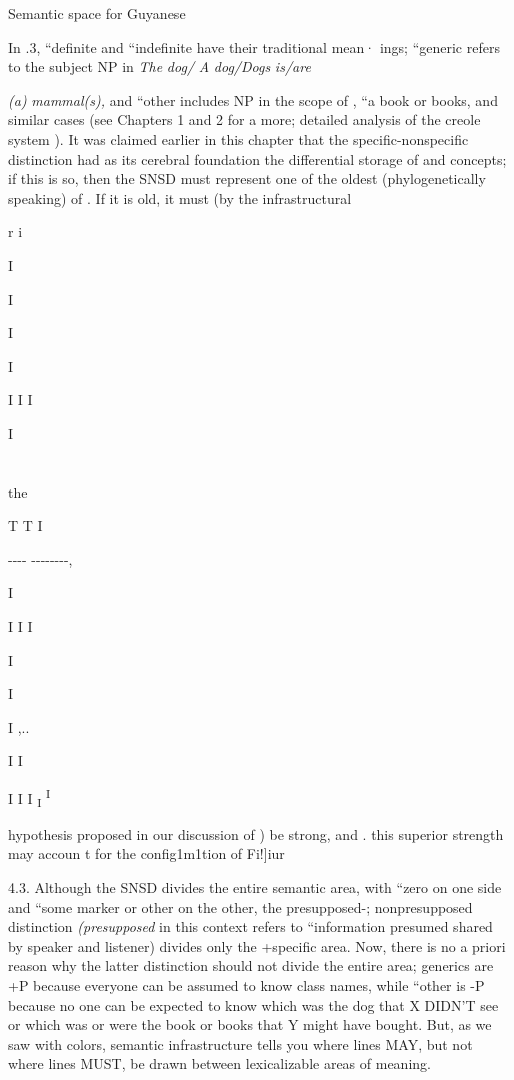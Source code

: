 Semantic space for Guyanese 



In .3, ``definite and ``indefinite have their traditional mean· ings; ``generic refers to the subject NP in \textit{The} \textit{dog}\textit{/} \textit{A} \textit{dog/Dogs} \textit{is/are}

\textit{(a)} \textit{mammal(s), }and ``other includes NP in the scope of , ``a book or books, and similar cases (see Chapters 1 and 2 for a more; detailed analysis of the creole system ). It was claimed earlier in this chapter that the specific-nonspecific distinction had as its cerebral foundation the differential storage of  and concepts; if this is so, then the SNSD must represent one of the oldest (phylogenetically
speaking) of . If it is old, it must (by the infrastructural

r i

I

I

I

I

I I I

I

\section{}
the

T T I

{}-{}-{}-{}- {}-{}-{}-{}-{}-{}-{}-{}-,

I 

I I I

I

I

I ,..

I I

I I I \textsubscript{I }\textsuperscript{I} 

hypothesis proposed in our discussion of ) be strong, and . this superior strength may accoun t for the config1m1tion of Fi!]iur

4.3. Although the SNSD divides the entire semantic area, with ``zero on one side and ``some marker or other on the other, the presupposed-; nonpresupposed distinction \textit{(presupposed} in this context refers to ``information presumed shared by speaker and listener{\textquotedbl}) divides only the +specific area. Now, there is no a priori reason why the latter distinction should not divide the entire area; generics are +P because everyone can be assumed to know class names, while ``other is {}-P because no one can be expected to know which was the dog that X DIDN'T see or which was or were the book or books that Y might have bought. But, as we saw with colors, semantic infrastructure tells you where lines MAY, but not where lines MUST, be drawn between lexicalizable areas of meaning.

